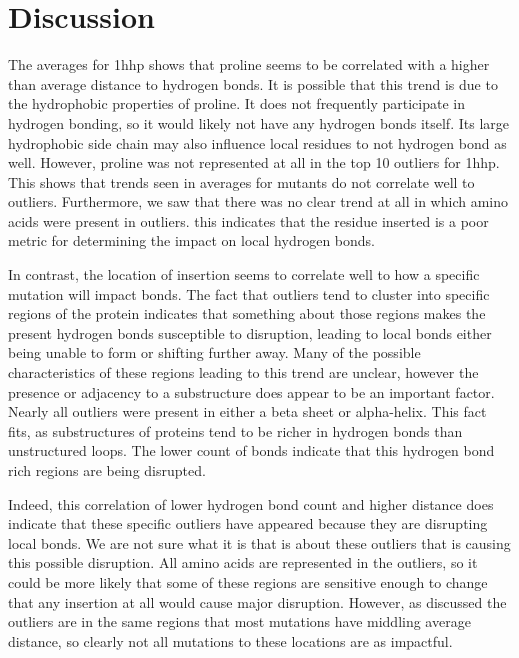\documentclass[sigconf, screen, authorversion, authoraddress=false, oneside]{acmart}
\begin{document}
\section{Discussion}
The averages for 1hhp shows that proline seems to be correlated with a higher than average distance to hydrogen bonds. It is possible that this trend is due to the hydrophobic properties of proline. It does not frequently participate in hydrogen bonding, so it would likely not have any hydrogen bonds itself. Its large hydrophobic side chain may also influence local residues to not hydrogen bond as well. However, proline was not represented at all in the top 10 outliers for 1hhp. This shows that trends seen in averages for mutants do not correlate well to outliers. Furthermore, we saw that there was no clear trend at all in which amino acids were present in outliers. this indicates that the residue inserted is a poor metric for determining the impact on local hydrogen bonds.

In contrast, the location of insertion seems to correlate well to how a specific mutation will impact bonds. The fact that outliers tend to cluster into specific regions of the protein indicates that something about those regions makes the present hydrogen bonds susceptible to disruption, leading to local bonds either being unable to form or shifting further away. Many of the possible characteristics of these regions leading to this trend are unclear, however the presence or adjacency to a substructure does appear to be an important factor. Nearly all outliers were present in either a beta sheet or alpha-helix. This fact fits, as substructures of proteins tend to be richer in hydrogen bonds than unstructured loops. The lower count of bonds indicate that this hydrogen bond rich regions are being disrupted.

Indeed, this correlation of lower hydrogen bond count and higher distance does indicate that these specific outliers have appeared because they are disrupting local bonds. We are not sure what it is that is about these outliers that is causing this possible disruption. All amino acids are represented in the outliers, so it could be more likely that some of these regions are sensitive enough to change that any insertion at all would cause major disruption. However, as discussed the outliers are in the same regions that most mutations have middling average distance, so clearly not all mutations to these locations are as impactful.
\end{document}
